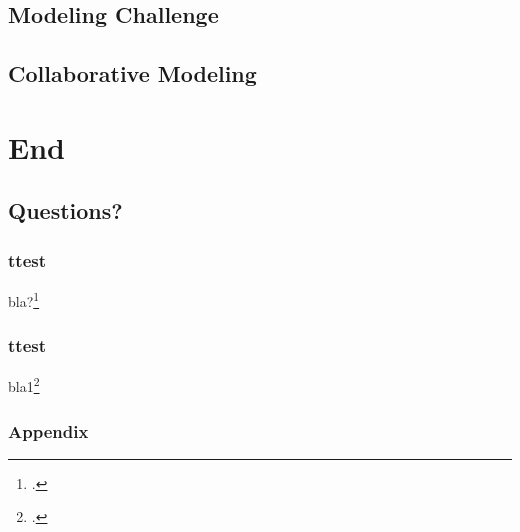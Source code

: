 \documentclass{beamer}
\begin{document}
\subsection{Modeling Challenge}
\subsection{Collaborative Modeling}

\section*{End}
\subsection*{Questions?}





\begin{frame}
  \frametitle{ttest}
  bla?\footcite{glass-jc}
\end{frame}

\begin{frame}
  \frametitle{ttest}
  bla1\footcite{glass-jc}
\end{frame}

\appendix

\begin{frame}
  \frametitle{Appendix}
\end{frame}

\begin{frame}
\end{frame}
\end{document}
